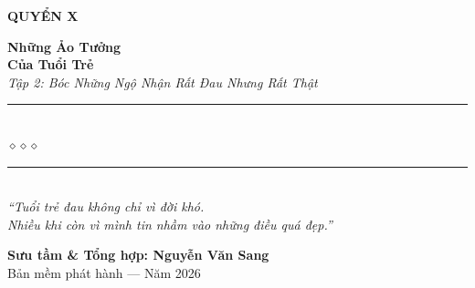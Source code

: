 \begin{titlepage}
\begin{center}
  \begin{tcolorbox}[
    width=6.5cm,
    colback=truyengold!20,
    colframe=truyengold!80!black,
    arc=4pt,
    boxrule=1.5pt,
    halign=center
  ]
    {\fontsize{18}{22}\selectfont\bfseries\color{truyenred!80!black}
     QUYỂN X}
  \end{tcolorbox}
  \vspace{0.8cm}

  {\fontsize{38}{45}\selectfont\bfseries\color{truyenred!80!black}
    Những Ảo Tưởng}\\[0.4cm]
  {\fontsize{38}{45}\selectfont\bfseries\color{truyengold!80!black}
    Của Tuổi Trẻ}\\[0.4cm]

  {\fontsize{16}{20}\selectfont\color{truyengold!90!black}\itshape
    Tập 2: Bóc Những Ngộ Nhận Rất Đau Nhưng Rất Thật}\\[1cm]

  {\color{truyenblue!60}\rule{6cm}{1pt}}\\[5pt]
  {\color{truyengold!80!black}\large$\diamond$\hspace{1cm}$\diamond$\hspace{1cm}$\diamond$}\\[5pt]
  {\color{truyenblue!60}\rule{6cm}{1pt}}\\[1.5cm]

  {\normalsize\itshape\color{truyenblue!90!black}
   ``Tuổi trẻ đau không chỉ vì đời khó.\\
   Nhiều khi còn vì mình tin nhầm vào những điều quá đẹp.''}

  \vfill

  {\fontsize{16}{20}\selectfont\bfseries\color{truyenblue!90!black}
    Sưu tầm \& Tổng hợp: \textbf{Nguyễn Văn Sang}}\\[0.4cm]

  {\small\color{gray} Bản mềm phát hành --- Năm 2026}\\[0.5cm]
\end{center}

\afterpage{\nopagecolor}
\end{titlepage}